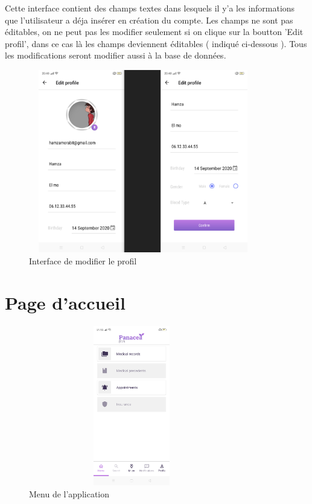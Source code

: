 Cette interface contient des champs textes dans lesquels il y'a les informations que l'utilisateur a déja insérer en création du compte.
Les champs ne sont pas éditables, on ne peut pas les modifier seulement si on clique sur la boutton 'Edit profil', dans ce cas là les champs deviennent éditables ( indiqué ci-dessous ).
Tous les modifications seront modifier aussi à la base de données.
\begin{figure}[H]
  \centering
\includegraphics[width=10cm,height=8cm,keepaspectratio]{Application/medd.png} 
\caption{Interface de modifier le profil}
\end{figure}

\section*{Page d’accueil }
\begin{figure}[H]
  \centering
\includegraphics[width=9cm,height=7cm,keepaspectratio]{Application/acc.png} 
\caption{Menu de l'application}
\end{figure}



